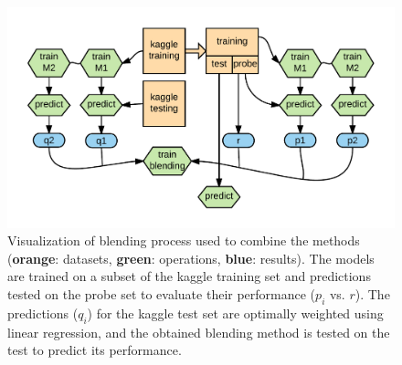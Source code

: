 \begin{figure}[htbp]
  \centering
  \includegraphics[width=\columnwidth]{figures/blending2.png}
  \vspace{-3mm}
  \caption{Visualization of blending process used to combine the
  methods (\textbf{orange}: datasets, 
  \textbf{green}: operations, \textbf{blue}: results).
  The models are trained on a subset of the kaggle training set and 
  predictions tested on the probe set to evaluate their performance 
  ($p_i$ vs. $r$). The predictions ($q_i$) for the kaggle test set
  are optimally weighted using linear regression, and the obtained blending method is tested on the test
  to predict its performance.}
  \label{fig:blending}
\end{figure}
